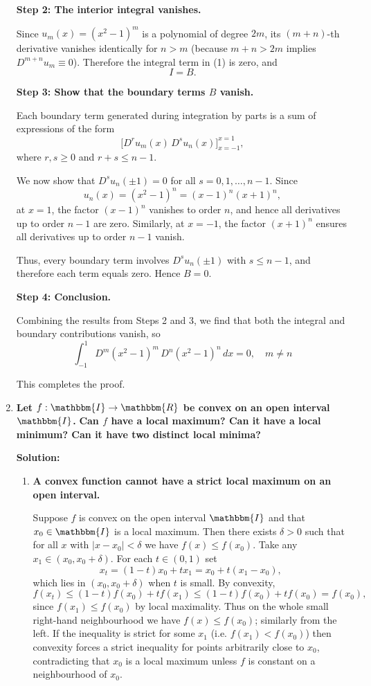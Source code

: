 \documentclass[14pt]{extarticle}
\begin{document}
\begin{enumerate}
\bigskip
\textbf{Step 2: The interior integral vanishes.}

Since $u_m(x) = (x^2 - 1)^m$ is a polynomial of degree $2m$, its $(m+n)$-th derivative vanishes identically for $n > m$ (because $m+n > 2m$ implies $D^{m+n}u_m \equiv 0$). Therefore the integral term in (1) is zero, and
\[
I = B.
\]

\bigskip
\textbf{Step 3: Show that the boundary terms $B$ vanish.}

Each boundary term generated during integration by parts is a sum of expressions of the form
\[
\big[D^r u_m(x) \, D^s u_n(x)\big]_{x=-1}^{x=1},
\]
where $r,s \ge 0$ and $r+s \le n-1$.

We now show that $D^s u_n(\pm 1) = 0$ for all $s = 0,1,\dots,n-1$. Since
\[
u_n(x) = (x^2 - 1)^n = (x-1)^n(x+1)^n,
\]
at $x = 1$, the factor $(x-1)^n$ vanishes to order $n$, and hence all derivatives up to order $n-1$ are zero. Similarly, at $x=-1$, the factor $(x+1)^n$ ensures all derivatives up to order $n-1$ vanish.

Thus, every boundary term involves $D^s u_n(\pm 1)$ with $s \le n-1$, and therefore each term equals zero. Hence $B = 0$.

\bigskip
\textbf{Step 4: Conclusion.}

Combining the results from Steps 2 and 3, we find that both the integral and boundary contributions vanish, so
\[
\boxed{\int_{-1}^1 D^m(x^2 - 1)^m \, D^n(x^2 - 1)^n \, dx = 0, \quad m \ne n}
\]

This completes the proof.


\bigskip
\item \textbf{Let $f:\mathbbm{I}\to\mathbbm{R}$ be convex on an open interval $\mathbbm{I}$.}
\textbf{Can $f$ have a local maximum? Can it have a local minimum? Can it have two distinct local minima?}

\textbf{Solution:}

\begin{enumerate}
\item \textbf{A convex function cannot have a strict local maximum on an open interval.}

Suppose $f$ is convex on the open interval $\mathbbm{I}$ and that $x_0\in\mathbbm{I}$ is a local maximum. Then there exists $\delta>0$ such that for all $x$ with $|x-x_0|<\delta$ we have $f(x)\le f(x_0)$. Take any $x_1\in (x_0,x_0+\delta)$. For each $t\in(0,1)$ set
\[
x_t = (1-t)x_0 + t x_1 = x_0 + t(x_1-x_0),
\]
which lies in $(x_0,x_0+\delta)$ when $t$ is small. By convexity,
\[
f(x_t) \le (1-t)f(x_0) + t f(x_1) \le (1-t)f(x_0) + t f(x_0) = f(x_0),
\]
since $f(x_1)\le f(x_0)$ by local maximality. Thus on the whole small right-hand neighbourhood we have $f(x)\le f(x_0)$; similarly from the left. If the inequality is strict for some $x_1$ (i.e. $f(x_1)<f(x_0)$) then convexity forces a strict inequality for points arbitrarily close to $x_0$, contradicting that $x_0$ is a local maximum unless $f$ is constant on a neighbourhood of $x_0$.



\end{enumerate}
\end{enumerate}
\end{document}
